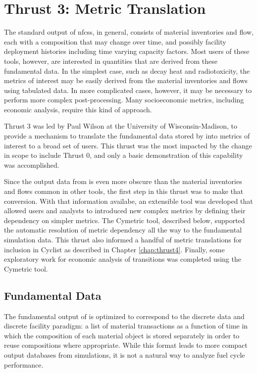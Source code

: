 \chapter{Thrust 3: Metric Translation}\label{chap:thrust3}

The standard output of \glspl{nfcs}, in general, consists of material
inventories and flow, each with a composition that may change over time, and
possibly facility deployment histories including time varying capacity
factors.  Most users of these tools, however, are interested in quantities
that are derived from these fundamental data.  In the simplest case, such as
decay heat and radiotoxicity, the metrics of interest may be easily derived
from the material inventories and flows using tabulated data.  In more
complicated cases, however, it may be necessary to perform more complex
post-processing.  Many socioeconomic metrics, including economic analysis,
require this kind of approach.

Thrust 3 was led by Paul Wilson at the University of Wisconsin-Madison, to
provide a mechanism to translate the fundamental data stored by \Cyclus into
metrics of interest to a broad set of users.  This thrust was the most
impacted by the change in scope to include Thrust 0, and only a basic
demonstration of this capability was accomplished.

Since the output data from \Cyclus is even more obscure than the material
inventories and flows common in other tools, the first step in this thrust was
to make that conversion.  With that information availabe, an extensible tool
was developed that allowed users and analysts to introduced new complex
metrics by defining their dependency on simpler metrics.  The Cymetric tool,
described below, supported the automatic resolution of metric dependency all
the way to the fundamental simulation data.  This thrust also informed a
handful of metric translations for inclusion in Cyclist as described in
Chapter \ref{chap:thrust4}.  Finally, some exploratory work for economic
analysis of transitions was completed using the Cymetric tool.

\section{Fundamental Data}\label{sec:fund_data}

The fundamental output of \Cyclus is optimized to correspond to the discrete
data and discrete facility paradigm: a list of material transactions as a
function of time in which the composition of each material object is stored
separately in order to reuse compositions where appropriate.  While this
format leads to more compact output databases from \Cyclus simulations, it is
not a natural way to analyze fuel cycle performance.

